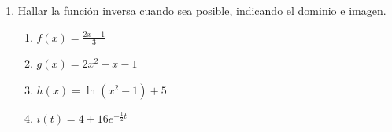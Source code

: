 \documentclass[a4paper]{article}
\newcommand{\exercise}{\item}
\begin{document}
\begin{enumerate}
\begin{enumerate} [label=(\alph*)]
		\item $f(x)=\ln(x)$ ~y~ $g(x)=x^2+4$
		\item $f(x)=\sin(x)$ ~y~ $g(x)=\displaystyle{e^{x^2-2x+1}}$
	\end{enumerate}
	\exercise Hallar la función inversa cuando sea posible, indicando el dominio e imagen.
	\begin{enumerate} [label=(\alph*)]
		\item $f(x)=\displaystyle\frac{2x-1}{3}$
		\item $g(x)=2x^2+x-1$
		\item $h(x)=\ln(x^2-1)+5$
		\item $i(t)=\displaystyle{4+16 e^{-\frac{1}{2}t}}$
	\end{enumerate}
\end{enumerate}
\vspace{20pt} 
\end{document}

